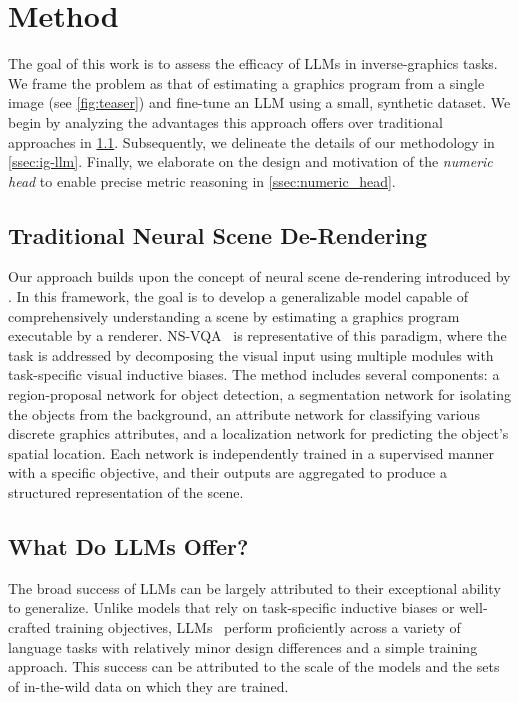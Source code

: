 \section{Method}\label{sec:method}
The goal of this work is to assess the efficacy of LLMs in inverse-graphics tasks. 
We frame the problem as that of estimating a graphics program from a single image (see \cref{fig:teaser}) and fine-tune an LLM using a small, synthetic dataset.
We begin by analyzing the advantages this approach offers over traditional approaches in \cref{ssec:derendering}.
Subsequently, we delineate the details of our methodology in \cref{ssec:ig-llm}.
Finally, we elaborate on the design and motivation of the \emph{numeric head} to enable precise metric reasoning in \cref{ssec:numeric_head}.

\subsection{Traditional Neural Scene De-Rendering}\label{ssec:derendering}
Our approach builds upon the concept of neural scene de-rendering introduced by \citet{wu2017neural}.
In this framework, the goal is to develop a generalizable model capable of comprehensively understanding a scene by estimating a graphics program executable by a renderer.
NS-VQA~\citep{yi2018neural} is representative of this paradigm, where the task is addressed by decomposing the visual input using multiple modules with task-specific visual inductive biases.
The method includes several components: a region-proposal network for object detection, a segmentation network for isolating the objects from the background, an attribute network for classifying various discrete graphics attributes, and a localization network for predicting the object's spatial location.
Each network is independently trained in a supervised manner with a specific objective, and their outputs are aggregated to produce a structured representation of the scene.

\subsection{What Do LLMs Offer?}
The broad success of LLMs can be largely attributed to their exceptional ability to generalize.
Unlike models that rely on task-specific inductive biases or well-crafted training objectives, LLMs~\citep{Brown2020LanguageMA, Radford2019LanguageMA, touvron2023llama} perform proficiently across a variety of language tasks with relatively minor design differences and a simple training approach.
This success can be attributed to the scale of the models and the sets of in-the-wild data on which they are trained.

